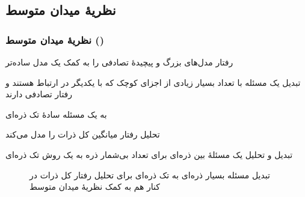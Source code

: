 \documentclass[xcolor=dvipsnames, professionalfonts, aspectratio=169, 11pt]{beamer}
\begin{document}
\subsection{نظریهٔ میدان متوسط}
\begin{frame}
    \frametitle{نظریهٔ میدان متوسط ()}

    \begin{moredi}
        \item رفتار مدل‌های بزرگ و پیچیدهٔ تصادفی را به کمک یک مدل ساده‌تر
        \begin{moredi}
            \item تبدیل یک مسئله با تعداد بسیار زیادی از اجزای کوچک که با یکدیگر در ارتباط هستند و رفتار تصادفی دارند
            \item به یک مسئله سادهٔ تک ذره‌ای
            \item تحلیل رفتار میانگین کل ذرات را مدل می‌کند
        \end{moredi}
        \item تبدیل و تحلیل یک مسئلهٔ بین ذره‌ای برای تعداد بی‌شمار ذره به یک روش تک ذره‌ای
    \end{moredi}
    \begin{figure}
        \caption{تبدیل مسئله بسیار ذره‌ای به تک ذره‌ای برای تحلیل رفتار کل ذرات در کنار هم به کمک نظریهٔ میدان متوسط}
        \label{fig:mft-sample}
    \end{figure}

\end{frame}
\end{document}

